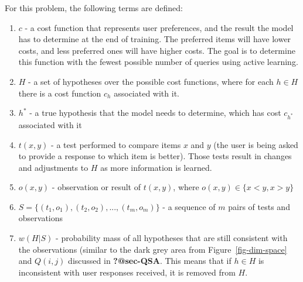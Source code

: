\documentclass[
  letterpaper,
  numbers=noenddot,
  DIV=11]{scrreprt}
\theoremstyle{definition}
\theoremstyle{plain}
\theoremstyle{plain}
\theoremstyle{remark}
\begin{document}
For this problem, the following terms are defined:

\begin{enumerate}
\def\labelenumi{\arabic{enumi}.}
\item
  \(c\) - a cost function that represents user preferences, and the
  result the model has to determine at the end of training. The
  preferred items will have lower costs, and less preferred ones will
  have higher costs. The goal is to determine this function with the
  fewest possible number of queries using active learning.
\item
  \(H\) - a set of hypotheses over the possible cost functions, where
  for each \(h \in H\) there is a cost function \(c_h\) associated with
  it.
\item
  \(h^*\) - a true hypothesis that the model needs to determine, which
  has cost \(c_{h^*}\) associated with it
\item
  \(t(x,y)\) - a test performed to compare items \(x\) and \(y\) (the
  user is being asked to provide a response to which item is better).
  Those tests result in changes and adjustments to \(H\) as more
  information is learned.
\item
  \(o(x,y)\) - observation or result of \(t(x,y)\), where
  \(o(x,y) \in \{x<y, x>y\}\)
\item
  \(S = \{(t_1, o_1), (t_2, o_2),...,(t_m, o_m)\}\) - a sequence of
  \(m\) pairs of tests and observations
\item
  \(w(H|S)\) - probability mass of all hypotheses that are still
  consistent with the observations (similar to the dark grey area from
  Figure~\ref{fig-dim-space} and \(Q(i,j)\) discussed in
  \textbf{?@sec-QSA}. This means that if \(h \in H\) is inconsistent
  with user responses received, it is removed from \(H\).
\end{enumerate}
\end{document}
